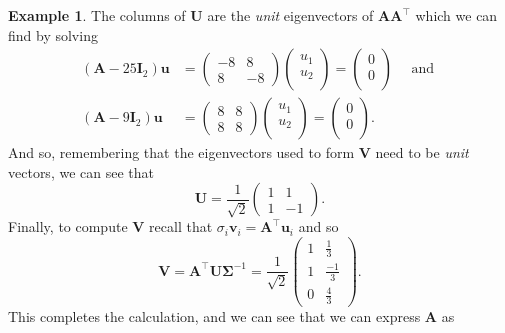 \documentclass[]{book}
\theoremstyle{definition}
\theoremstyle{definition}
\newtheorem{example}{Example}[chapter]
\theoremstyle{definition}
\theoremstyle{remark}
\begin{document}
\begin{example}
The columns of \(\boldsymbol U\) are the \emph{unit} eigenvectors of \(\boldsymbol A\boldsymbol A^\top\) which we can find by solving
\begin{align*}(\boldsymbol A-25\mathbf I_2)\boldsymbol u&=\left(\begin{array}{cc}-8&8\\
               8&-8\end{array}\right)\left(\begin{array}{c}u_1\\u_2\\\end{array}\right)=\left(\begin{array}{c}0\\0\\\end{array}\right) \quad \mbox{ and }\\ (\boldsymbol A-9\mathbf I_2)\boldsymbol u&=\left(\begin{array}{cc}8&8\\
               8&8\end{array}\right)\left(\begin{array}{c}u_1\\u_2\\\end{array}\right)=\left(\begin{array}{c}0\\0\\\end{array}\right).\end{align*}
And so, remembering that the eigenvectors used to form \(\boldsymbol V\) need to be \emph{unit} vectors, we can see that
\[\boldsymbol U=\frac{1}{\sqrt{2}}\left(\begin{array}{cc}1&1\\
               1&-1\end{array}\right).\]
Finally, to compute \(\boldsymbol V\) recall that \(\sigma_i \boldsymbol v_i = \boldsymbol A^\top \boldsymbol u_i\) and so
\[\boldsymbol V= \boldsymbol A^\top\boldsymbol U\boldsymbol \Sigma^{-1} = \frac{1}{\sqrt{2}}\left(\begin{array}{cc}1&\frac{1}{3}\\
                                                           1&\frac{-1}{3}\\
                                                           0&\frac{4}{3}\end{array}\right).
\]
This completes the calculation, and we can see that we can express \(\boldsymbol A\) as

\end{example}
\end{document}
